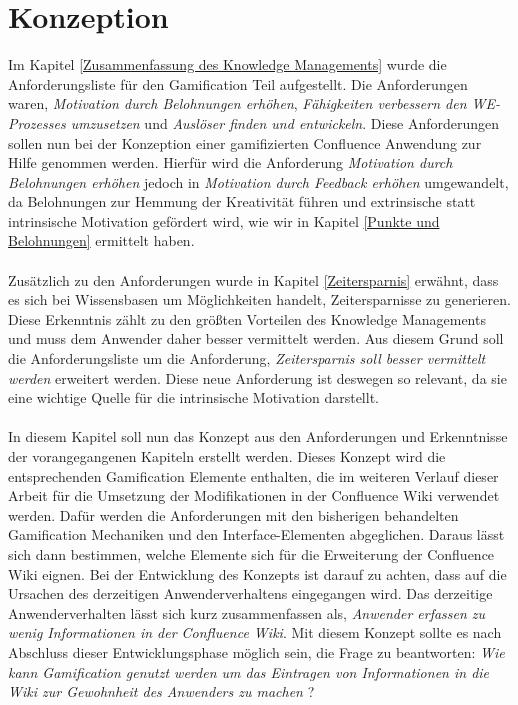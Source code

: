 \documentclass[a4paper,12pt,twoside]{scrartcl}
\begin{document}
\section{Konzeption}
\label{Konzeption}
Im Kapitel \ref{Zusammenfassung des Knowledge Managements} wurde die Anforderungsliste für den Gamification Teil aufgestellt. Die Anforderungen waren, \textit{Motivation durch Belohnungen erhöhen}, \textit{Fähigkeiten verbessern den WE-Prozesses umzusetzen} und \textit{Auslöser finden und entwickeln}. Diese Anforderungen sollen nun bei der Konzeption einer gamifizierten Confluence Anwendung zur Hilfe genommen werden. Hierfür wird die Anforderung \textit{Motivation durch Belohnungen erhöhen} jedoch in \textit{Motivation durch Feedback erhöhen} umgewandelt, da Belohnungen zur Hemmung der Kreativität führen und extrinsische statt intrinsische Motivation gefördert wird, wie wir in Kapitel \ref{Punkte und Belohnungen} ermittelt haben. 
\\\\
Zusätzlich zu den Anforderungen wurde in Kapitel \ref{Zeitersparnis} erwähnt, dass es sich bei Wissensbasen um Möglichkeiten handelt, Zeitersparnisse zu generieren. Diese Erkenntnis zählt zu den größten Vorteilen des Knowledge Managements und muss dem Anwender daher besser vermittelt werden. Aus diesem Grund soll die Anforderungsliste um die Anforderung, \textit{Zeitersparnis soll besser vermittelt werden} erweitert werden. Diese neue Anforderung ist deswegen so relevant, da sie eine wichtige Quelle für die intrinsische Motivation darstellt.
\\\\
In diesem Kapitel soll nun das Konzept aus den Anforderungen und Erkenntnisse der vorangegangenen Kapiteln erstellt werden. Dieses Konzept wird die entsprechenden Gamification Elemente enthalten, die im weiteren Verlauf dieser Arbeit für die Umsetzung der Modifikationen in der Confluence Wiki verwendet werden. Dafür werden die Anforderungen mit den bisherigen behandelten Gamification Mechaniken und den Interface-Elementen abgeglichen. Daraus lässt sich dann bestimmen, welche Elemente sich für die Erweiterung der Confluence Wiki eignen. Bei der Entwicklung des Konzepts ist darauf zu achten, dass auf die Ursachen des derzeitigen Anwenderverhaltens eingegangen wird. Das derzeitige Anwenderverhalten lässt sich kurz zusammenfassen als, \textit{Anwender erfassen zu wenig Informationen in der Confluence Wiki}. Mit diesem Konzept sollte es nach Abschluss dieser Entwicklungsphase möglich sein, die Frage zu beantworten: \textit{Wie kann Gamification genutzt werden um das Eintragen von Informationen in die Wiki zur Gewohnheit des Anwenders zu machen} ?
\end{document}
